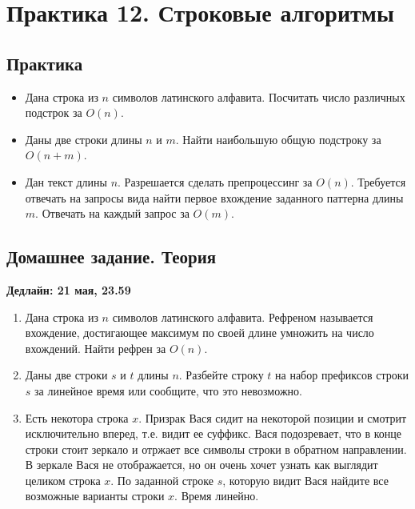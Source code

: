 \section{Практика 12. Строковые алгоритмы}

\subsection{Практика}

\begin{itemize}

  \item Дана строка из $n$ символов латинского алфавита. Посчитать число различных 
  подстрок за $O(n)$.

  \item Даны две строки длины $n$ и $m$. Найти наибольшую общую подстроку
  за $O(n + m)$.

  \item Дан текст длины $n$. Разрешается сделать препроцессинг за $O(n)$.
  Требуется отвечать на запросы вида найти первое вхождение заданного 
  паттерна длины $m$. Отвечать на каждый запрос за $O(m)$.

\end{itemize}

\subsection{Домашнее задание. Теория}
\textbf{Дедлайн: 21 мая, 23.59}

\begin{enumerate}

  \item Дана строка из $n$ символов латинского алфавита. Рефреном называется
  вхождение, достигающее максимум по своей длине умножить на число вхождений.
  Найти рефрен за $O(n)$.

  \item Даны две строки $s$ и $t$ длины $n$. Разбейте строку $t$ на набор префиксов
  строки $s$ за линейное время или сообщите, что это невозможно.

  \item Есть некотора строка $x$. Призрак Вася сидит на некоторой позиции и смотрит исключительно
  вперед, т.е. видит ее суффикс. Вася подозревает, что в конце строки стоит зеркало и отржает все символы
  строки в обратном направлении. В зеркале Вася не отображается, но он очень хочет узнать как выглядит 
  целиком строка $x$. По заданной строке $s$, которую видит Вася найдите все возможные варианты строки $x$.
  Время линейно.


\end{enumerate}



\clearpage
